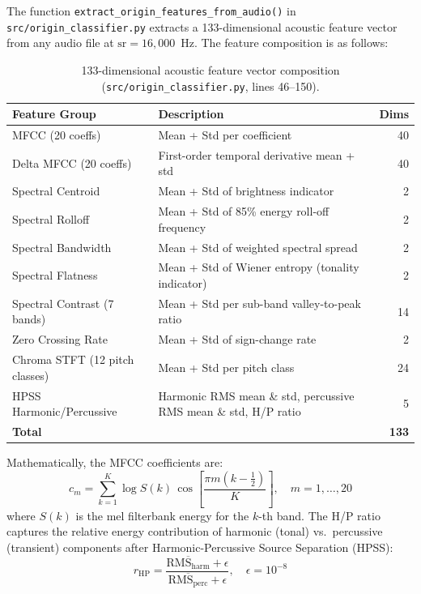 \documentclass[12pt,a4paper]{article}
\begin{document}
The function \texttt{extract\_origin\_features\_from\_audio()} in
\texttt{src/origin\_classifier.py} extracts a 133-dimensional acoustic feature
vector from any audio file at $\text{sr} = 16{,}000$~Hz.
The feature composition is as follows:

\renewcommand{\arraystretch}{1.2}
\begin{table}[H]
\centering
\caption{133-dimensional acoustic feature vector composition (\texttt{src/origin\_classifier.py}, lines 46--150).}
\label{tab:features}
\begin{tabularx}{\textwidth}{|l|X|r|}
\hline
\textbf{Feature Group} & \textbf{Description} & \textbf{Dims} \\
\hline
MFCC (20 coeffs) & Mean + Std per coefficient & 40 \\
\hline
Delta MFCC (20 coeffs) & First-order temporal derivative mean + std & 40 \\
\hline
Spectral Centroid & Mean + Std of brightness indicator & 2 \\
\hline
Spectral Rolloff & Mean + Std of 85\% energy roll-off frequency & 2 \\
\hline
Spectral Bandwidth & Mean + Std of weighted spectral spread & 2 \\
\hline
Spectral Flatness & Mean + Std of Wiener entropy (tonality indicator) & 2 \\
\hline
Spectral Contrast (7 bands) & Mean + Std per sub-band valley-to-peak ratio & 14 \\
\hline
Zero Crossing Rate & Mean + Std of sign-change rate & 2 \\
\hline
Chroma STFT (12 pitch classes) & Mean + Std per pitch class & 24 \\
\hline
HPSS Harmonic/Percussive & Harmonic RMS mean \& std, percussive RMS mean \& std, H/P ratio & 5 \\
\hline
\textbf{Total} & & \textbf{133} \\
\hline
\end{tabularx}
\end{table}

Mathematically, the MFCC coefficients are:
\[
  c_m = \sum_{k=1}^{K} \log S(k)\, \cos\!\left[\frac{\pi m (k - \tfrac{1}{2})}{K}\right], \quad m = 1, \ldots, 20
\]
where $S(k)$ is the mel filterbank energy for the $k$-th band. The H/P ratio
captures the relative energy contribution of harmonic (tonal) vs.\ percussive
(transient) components after Harmonic-Percussive Source Separation (HPSS):
\[
  r_{\mathrm{HP}} = \frac{\overline{\mathrm{RMS}_{\mathrm{harm}}} + \epsilon}{\overline{\mathrm{RMS}_{\mathrm{perc}}} + \epsilon}, \quad \epsilon = 10^{-8}
\]
\end{document}
